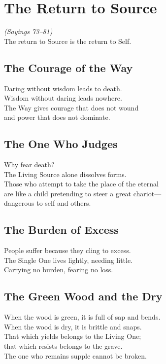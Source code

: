 \documentclass[10pt, openright]{book}
\begin{document}
\chapter{The Return to Source}
\begin{center}
    \textit{(Sayings 73--81)} \\
    \vspace{0.5cm}
    \small The return to Source is the return to Self.
\end{center}
\vspace{0.5cm}

\section{The Courage of the Way}
Daring without wisdom leads to death. \\
Wisdom without daring leads nowhere. \\
The Way gives courage that does not wound \\
and power that does not dominate.

\section{The One Who Judges}
Why fear death? \\
The Living Source alone dissolves forms. \\
Those who attempt to take the place of the eternal \\
are like a child pretending to steer a great chariot— \\
dangerous to self and others.

\section{The Burden of Excess}
People suffer because they cling to excess. \\
The Single One lives lightly, needing little. \\
Carrying no burden, fearing no loss.

\section{The Green Wood and the Dry}
When the wood is green, it is full of sap and bends. \\
When the wood is dry, it is brittle and snaps. \\
That which yields belongs to the Living One; \\
that which resists belongs to the grave. \\
The one who remains supple cannot be broken.
\end{document}
